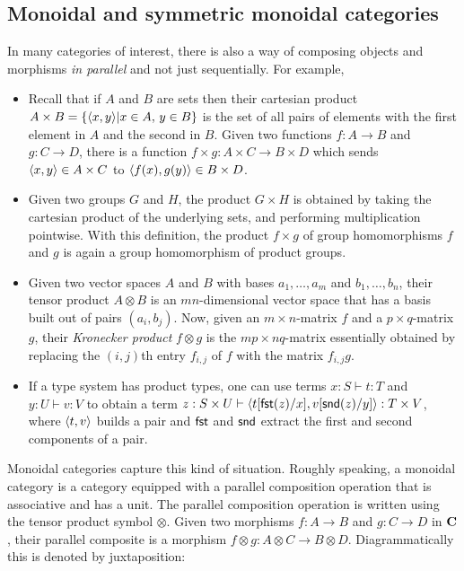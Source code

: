 \subsection{Monoidal and symmetric monoidal categories}\label{ssec:monoidalcats}
    In many categories of interest, there is also a way of composing objects and morphisms \emph{in parallel} and not just sequentially. For example,
\begin{itemize}
    \item Recall that if $A$ and $B$ are sets then their cartesian product $A \times B = \{\mathopen{\langle}x,y\mathclose{\rangle} | x \in A,\, y \in B\}$ is the set of all pairs of elements with the first element in $A$ and the second in $B$. Given two functions $f \colon A\to B$ and $g \colon C\to D$, there is a function $f\times g \colon A\times C\to B\times D$ which sends $\mathopen{\langle}x,y\mathclose{\rangle}\in A\times C$ to $\mathopen{\langle}f(x),g(y)\mathclose{\rangle}\in B\times D$. 

    \item Given two groups $G$ and $H$, the product $G\times H$ is obtained by taking the cartesian product of the underlying sets, and performing multiplication pointwise. With this definition, the product $f\times g$ of group homomorphisms $f$ and $g$ is again a group homomorphism of product groups. 

    \item Given two vector spaces $A$ and $B$ with bases $a_1,\dots, a_m$ and $b_1,\dots ,b_n$, their tensor product $A \otimes B$ is an $mn$-dimensional vector space that has a basis built out of pairs $(a_i,b_j)$. Now, given an $m\times n$-matrix $f$ and a $p\times q$-matrix $g$, their \emph{Kronecker product} $f \otimes g$ is the $mp\times nq$-matrix essentially obtained by replacing the $(i,j)$th entry $f_{i,j}$ of $f$ with the matrix $f_{i,j} g$. 
    
    \item If a type system has product types, one can use terms $x : S \vdash t : T$ and $y : U \vdash v : V$ to obtain a term $z : S\times U \vdash \mathopen{\langle}t[\mathsf{fst}(z)/x], v[\mathsf{snd}(z)/y]\mathclose{\rangle} : T\times V$, where $\mathopen{\langle}t,v\mathclose{\rangle}$ builds a pair and $\mathsf{fst}$ and $\mathsf{snd}$ extract the first and second components of a pair. 
\end{itemize}
Monoidal categories capture this kind of situation. Roughly speaking, a monoidal category is a category equipped with a parallel composition operation that is associative and has a unit.
The parallel composition operation is written using the tensor product symbol $ \otimes$.  Given two morphisms $f \colon A\to B$ and $g \colon C\to D$ in $\mathbf{C}$, their parallel composite is a morphism $f \otimes g \colon A \otimes C\to B \otimes D$. Diagrammatically this is denoted by juxtaposition:
